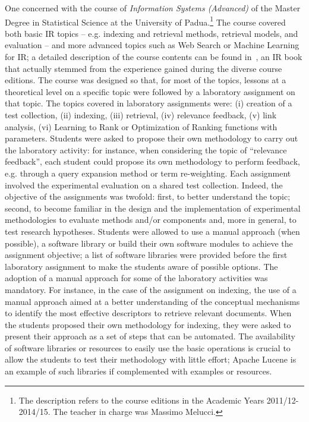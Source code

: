 One concerned with the course of {\em Information Systems (Advanced)} of the Master Degree in Statistical Science at the University of Padua.\footnote{The description refers to the course editions in the Academic Years 2011/12-2014/15. The teacher in charge was Massimo Melucci.}
The course covered both basic IR topics -- e.g. indexing and retrieval methods, retrieval models, and evaluation -- and more advanced topics such as Web Search or Machine Learning for IR; a detailed description of the course contents can be found in~\cite{Melucci2013}, an IR book that actually stemmed from the experience gained during the diverse course editions.
The course was designed so that, for most of the topics, lessons at a theoretical level on a specific topic were followed by a laboratory assignment on that topic.
The topics covered in laboratory assignments were: (i) creation of a test collection, (ii) indexing, (iii) retrieval, (iv) relevance feedback, (v) link analysis, (vi) Learning to Rank or Optimization of Ranking functions with parameters. Students were asked to propose their own methodology to carry out the laboratory activity: for instance, when considering the topic of ``relevance feedback'', each student could propose its own methodology to perform feedback, e.g. through a query expansion method or term re-weighting.
Each assignment involved the experimental evaluation on a shared test collection. Indeed, the objective of the assignments was twofold: first, to better understand the topic; second, to become familiar in the design and the implementation of experimental methodologies to evaluate methods and/or components and, more in general, to test research hypotheses.
Students were allowed to use a manual approach (when possible), a software library or build their own software modules to achieve the assignment objective; a list of software libraries were provided before the first laboratory assignment to make the students aware of possible options.
The adoption of a manual approach for some of the laboratory activities was mandatory. For instance, in the case of the assignment on indexing, the use of a manual approach aimed at a better understanding of the conceptual mechanisms to identify the most effective descriptors to retrieve relevant documents.
When the students proposed their own methodology for indexing, they were asked to present their approach as a set of steps that can be automated.
The availability of software libraries or resources to easily use the basic operations is crucial to allow the students to test their methodology with little effort; Apache Lucene is an example of such libraries if complemented with examples or resources.
